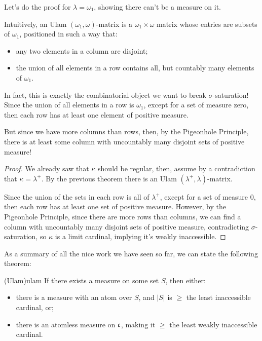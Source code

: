\begin{sketch}
    Let's do the proof for $\lambda=\omega_1$, showing there can't be a measure on it.

    Intuitively, an Ulam $(\omega_1,\omega)$-matrix is a $\omega_1\times\omega$ matrix whose entries are subsets of $\omega_1$, positioned in such a way that:
    \begin{itemize}
        \item any two elements in a column are disjoint;
        \item the union of all elements in a row contains all, but countably many elements of $\omega_1$.
    \end{itemize}
    In fact, this is exactly the combinatorial object we want to break $\sigma$-saturation! Since the union of all elements in a row is $\omega_1$, except for a set of measure zero, then each row has at least one element of positive measure.

    But since we have more columns than rows, then, by the Pigeonhole Principle, there is at least some column with uncountably many disjoint sets of positive measure!
\end{sketch}

\begin{proof}
    We already saw that $\kappa$ should be regular, then, assume by a contradiction that $\kappa=\lambda^+$. By the previous theorem there is an Ulam $(\lambda^+,\lambda)$-matrix.

    Since the union of the sets in each row is all of $\lambda^+$, except for a set of measure $0$, then each row has at least one set of positive measure. However, by the Pigeonhole Principle, since there are more rows than columns, we can find a column with uncountably many disjoint sets of positive measure, contradicting $\sigma$-saturation, so $\kappa$ is a limit cardinal, implying it's weakly inaccessible.
\end{proof}

As a summary of all the nice work we have seen so far, we can state the following theorem:

\begin{theorem}{(Ulam)}{ulam}
    If there exists a measure on some set $S$, then either:
    \begin{itemize}
        \item there is a measure with an atom over $S$, and $\lvert S\rvert$ is $\geq$ the least inaccessible cardinal, or;
        \item there is an atomless measure on $\mathfrak{c}$, making it $\geq$ the least weakly inaccessible cardinal.
    \end{itemize}
\end{theorem}

